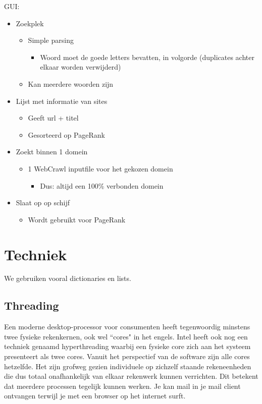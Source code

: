 \documentclass[12pt,a4paper]{article}
\begin{document}
GUI:
\begin{itemize}
\item Zoekplek
\begin{itemize}
\item Simple parsing
\begin{itemize}
\item Woord moet de goede letters bevatten, in volgorde (duplicates achter elkaar worden verwijderd)
\end{itemize}
\item Kan meerdere woorden zijn
\end{itemize}
\item Lijst met informatie van sites
\begin{itemize}
\item Geeft url + titel
\item Gesorteerd op PageRank
\end{itemize}
\end{itemize}

\begin{itemize}
\item Zoekt binnen 1 domein
\begin{itemize}
\item 1 WebCrawl inputfile voor het gekozen domein
\begin{itemize}
\item Dus: altijd een 100\% verbonden domein
\end{itemize}
\end{itemize}
\item Slaat op op schijf
\begin{itemize}
\item Wordt gebruikt voor PageRank
\end{itemize}
\end{itemize}

\section{Techniek}
We gebruiken vooral dictionaries en lists.
\subsection{Threading}
Een moderne desktop-processor voor consumenten heeft tegenwoordig minstens twee fysieke rekenkernen, ook wel ``cores" in het engels. Intel heeft ook nog een techniek genaamd hyperthreading waarbij een fysieke core zich aan het systeem presenteert als twee cores.
Vanuit het perspectief van de software zijn alle cores hetzelfde. Het zijn grofweg gezien individuele op zichzelf staande rekeneenheden die dus totaal onafhankelijk van elkaar rekenwerk kunnen verrichten. Dit betekent dat meerdere processen tegelijk kunnen werken. Je kan mail in je mail client ontvangen terwijl je met een browser op het internet surft. 
\end{document}
